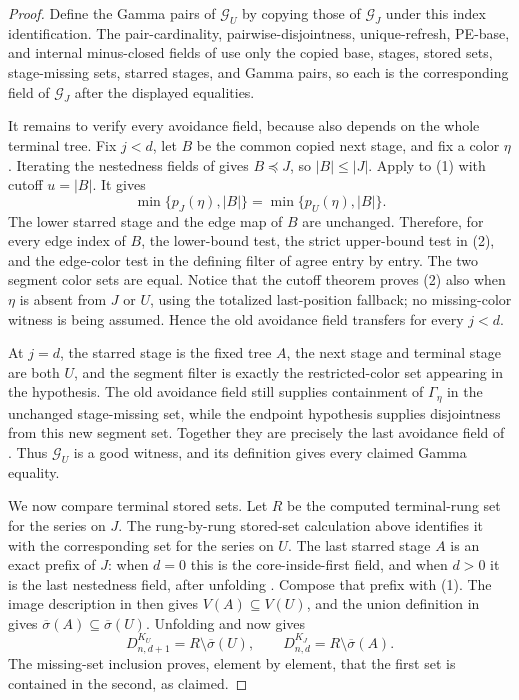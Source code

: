\begin{proof}
Define the Gamma pairs of $\mathcal G_U$ by copying those of
$\mathcal G_J$ under this index identification.  The pair-cardinality,
pairwise-disjointness, unique-refresh, PE-base, and internal minus-closed
fields of  use only the copied base, stages, stored
sets, stage-missing sets, starred stages, and Gamma pairs, so each is the
corresponding field of $\mathcal G_J$ after the displayed equalities.

It remains to verify every avoidance field, because
 also depends on the whole terminal tree.
Fix $j<d$, let $B$ be the common copied next stage, and fix a color
$\eta$.  Iterating the nestedness fields of
 gives $B\preccurlyeq J$, so $|B|\leq|J|$.
Apply  to (1) with
cutoff $u=|B|$.  It gives
\[
 \min\{p_J(\eta),|B|\}=\min\{p_U(\eta),|B|\}.              \tag{2}
\]
The lower starred stage and the edge map of $B$ are unchanged.  Therefore,
for every edge index of $B$, the lower-bound test, the strict upper-bound
test in (2), and the edge-color test in the defining filter of
 agree entry by entry.  The two segment
color sets are equal.  Notice that the cutoff theorem proves (2) also when
$\eta$ is absent from $J$ or $U$, using the totalized last-position
fallback; no missing-color witness is being assumed.  Hence the old
avoidance field transfers for every $j<d$.

At $j=d$, the starred stage is the fixed tree $A$, the next stage and
terminal stage are both $U$, and the segment filter is exactly the
restricted-color set appearing in the hypothesis.  The old avoidance
field still supplies containment of $\Gamma_\eta$ in the unchanged
stage-missing set, while the endpoint hypothesis supplies disjointness
from this new segment set.  Together they are precisely the last avoidance
field of .  Thus $\mathcal G_U$ is a good witness,
and its definition gives every claimed Gamma equality.

We now compare terminal stored sets.  Let $R$ be the computed terminal-rung
 set for the series on $J$.  The
rung-by-rung stored-set calculation above identifies it with the
corresponding set for the series on $U$.  The last starred stage $A$ is an
exact prefix of $J$: when $d=0$ this is the core-inside-first field, and
when $d>0$ it is the last nestedness field, after unfolding
.  Compose that prefix with (1).  The image
description in  then gives
$V(A)\subseteq V(U)$, and the union definition in
 gives
$\overline\sigma(A)\subseteq\overline\sigma(U)$.  Unfolding
 and
 now gives
\[
 D^{K_U}_{n,d+1}=R\setminus\overline\sigma(U),\qquad
 D^{K_J}_{n,d}=R\setminus\overline\sigma(A).                \tag{3}
\]
The missing-set inclusion proves, element by element, that the first set
is contained in the second, as claimed.


\end{proof}
